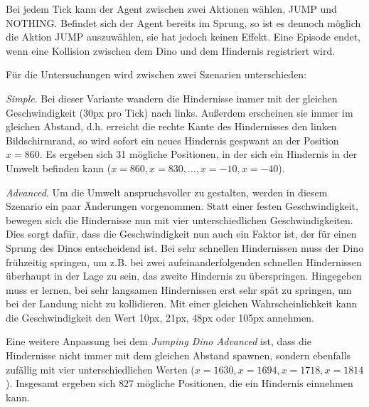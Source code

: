 Bei jedem Tick kann der Agent zwischen zwei Aktionen wählen, JUMP und NOTHING. Befindet sich der Agent bereits im Sprung, so ist es dennoch möglich die Aktion JUMP auszuwählen, sie hat jedoch keinen Effekt. Eine Episode endet, wenn eine Kollision zwischen dem Dino und dem Hindernis registriert wird.
\par 
Für die Untersuchungen wird zwischen zwei Szenarien unterschieden:
\par 
\textit{Simple}. Bei dieser Variante wandern die Hindernisse immer mit der gleichen Geschwindigkeit (30px pro Tick) nach links. Außerdem erscheinen sie immer im gleichen Abstand, d.h. erreicht die rechte Kante des Hindernisses den linken Bildschirmrand, so wird sofort ein neues Hindernis gespwant an der Position $x=860$. Es ergeben sich 31 mögliche Positionen, in der sich ein Hindernis in der Umwelt befinden kann ($x=860, x=830, \dots, x=-10, x=-40$).
\par 
\textit{Advanced}. Um die Umwelt anspruchsvoller zu gestalten, werden in diesem Szenario ein paar Änderungen vorgenommen. Statt einer festen Geschwindigkeit, bewegen sich die Hindernisse nun mit vier unterschiedlichen Geschwindigkeiten. Dies sorgt dafür, dass die Geschwindigkeit nun auch ein Faktor ist, der für einen Sprung des Dinos entscheidend ist. Bei sehr schnellen Hindernissen muss der Dino frühzeitig springen, um z.B. bei zwei aufeinanderfolgenden schnellen Hindernissen überhaupt in der Lage zu sein, das zweite Hindernis zu überspringen. Hingegeben muss er lernen, bei sehr langsamen Hindernissen erst sehr spät zu springen, um bei der Landung nicht zu kollidieren. Mit einer gleichen Wahrscheinlichkeit kann die Geschwindigkeit den Wert 10px, 21px, 48px oder 105px annehmen.
\par
Eine weitere Anpassung bei dem \textit{Jumping Dino Advanced} ist, dass die Hindernisse nicht immer mit dem gleichen Abstand spawnen, sondern ebenfalls zufällig mit vier unterschiedlichen Werten ($x=1630, x=1694, x=1718, x=1814$). Insgesamt ergeben sich 827 mögliche Positionen, die ein Hindernis einnehmen kann.

